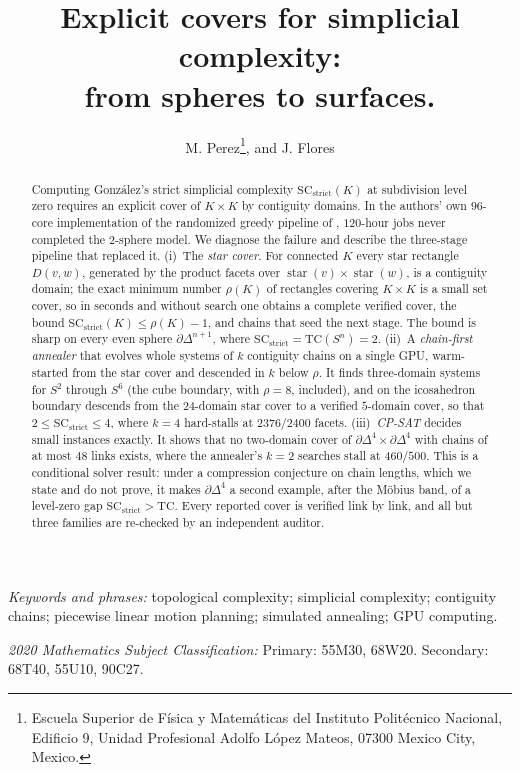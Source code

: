 \documentclass[12pt]{article}
\title{Explicit covers for simplicial complexity:\\
 from spheres to surfaces.}
\author{M. Perez\footnote{Escuela Superior de F\'isica
y Matem\'aticas del Instituto Polit\'ecnico Nacional, Edificio 9, Unidad
Profesional Adolfo L\'opez Mateos, 07300 Mexico City, Mexico.}, and
J. Flores\footnotemark[1]}
\date{}
\newcommand{\TC}{\mathrm{TC}}
\newcommand{\SC}{\mathrm{SC}}
\newcommand{\SCst}{\SC_{\mathrm{strict}}}
\begin{document}
\maketitle

\begin{abstract}
Computing Gonz\'alez's strict simplicial complexity $\SCst(K)$ at
subdivision level zero requires an explicit cover of $K\times K$ by
contiguity domains.  In the authors' own $96$-core implementation of the
randomized greedy pipeline of \cite{OLGB21}, $120$-hour jobs never
completed the $2$-sphere model.  We diagnose the failure and describe
the three-stage pipeline that replaced it.  (i)~The \emph{star cover}.
For connected $K$ every star rectangle $D(v,w)$, generated by the product
facets over $\operatorname{star}(v)\times\operatorname{star}(w)$, is a
contiguity domain; the exact minimum number $\rho(K)$ of rectangles
covering $K\times K$ is a small set cover, so in seconds and without
search one obtains a complete verified cover, the bound
$\SCst(K)\le\rho(K)-1$, and chains that seed the next stage.  The bound
is sharp on every even sphere $\partial\Delta^{n+1}$, where
$\SCst=\TC(S^n)=2$.  (ii)~A \emph{chain-first annealer} that evolves
whole systems of $k$ contiguity chains on a single GPU, warm-started from
the star cover and descended in $k$ below $\rho$.  It finds three-domain
systems for $S^2$ through $S^6$ (the cube boundary, with $\rho=8$,
included), and on the icosahedron boundary descends from the
$24$-domain star cover to a verified $5$-domain cover, so that
$2\le\SCst\le4$, where $k=4$ hard-stalls at $2376/2400$ facets.
(iii)~\emph{CP-SAT} decides small instances exactly.  It shows that no
two-domain cover of $\partial\Delta^4\times\partial\Delta^4$ with chains
of at most $48$ links exists, where the annealer's $k=2$ searches stall at
$460/500$.  This is a conditional solver result: under a compression
conjecture on chain lengths, which we state and do not prove, it makes
$\partial\Delta^4$ a second example, after the M\"obius band, of a
level-zero gap $\SCst>\TC$.  Every reported cover is verified link by
link, and all but three families are re-checked by an independent
auditor.
\end{abstract}

\medskip\noindent
\emph{Keywords and phrases:} topological complexity; simplicial
complexity; contiguity chains; piecewise linear motion planning;
simulated annealing; GPU computing.

\medskip\noindent
\emph{2020 Mathematics Subject Classification:} Primary: 55M30, 68W20.
Secondary: 68T40, 55U10, 90C27.
\end{document}
